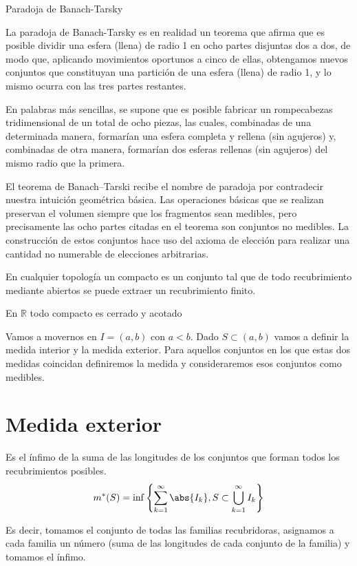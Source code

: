 \documentclass{apuntes}
\begin{document}
\begin{example}
Paradoja de Banach-Tarsky

La paradoja de Banach-Tarsky es en realidad un teorema que afirma que es posible dividir una esfera (llena) de radio 1 en ocho partes disjuntas dos a dos, de modo que, aplicando movimientos oportunos a cinco de ellas, obtengamos nuevos conjuntos que constituyan una partición de una esfera (llena) de radio 1, y lo mismo ocurra con las tres partes restantes.

En palabras más sencillas, se supone que es posible fabricar un rompecabezas tridimensional de un total de ocho piezas, las cuales, combinadas de una determinada manera, formarían una esfera completa y rellena (sin agujeros) y, combinadas de otra manera, formarían dos esferas rellenas (sin agujeros) del mismo radio que la primera.

El teorema de Banach–Tarski recibe el nombre de paradoja por contradecir nuestra intuición geométrica básica. Las operaciones básicas que se realizan preservan el volumen siempre que los fragmentos sean medibles, pero precisamente las ocho partes citadas en el teorema son conjuntos no medibles. La construcción de estos conjuntos hace uso del axioma de elección para realizar una cantidad no numerable de elecciones arbitrarias.

\end{example}

\begin{defn}[Compacto]
En cualquier topología un compacto es un conjunto tal que de todo recubrimiento mediante abiertos se puede extraer un recubrimiento finito.
\end{defn}

\begin{theorem}
En $\mathbb{R}$ todo compacto es cerrado y acotado
\end{theorem}

Vamos a movernos en $I=(a,b)$ con $a<b$. Dado $S \subset (a,b)$  vamos a definir la medida interior y la medida exterior. Para aquellos conjuntos en los que estas dos medidas coincidan definiremos la medida y consideraremos esos conjuntos como medibles.

\section{Medida exterior}
\begin{defn} Es el ínfimo de la suma de las longitudes de los conjuntos que forman todos los recubrimientos posibles.
\[m^*(S) = \inf \left\lbrace \sum_{k=1}^{\infty} \abs{I_k}, S\subset \bigcup_{k=1}^{\infty} I_k \right\rbrace\]

Es decir, tomamos el conjunto de todas las familias recubridoras, asignamos a cada familia un número (suma de las longitudes de cada conjunto de la familia) y tomamos el ínfimo.
\end{defn}
\end{document}
